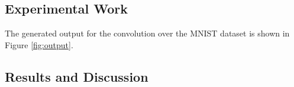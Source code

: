 \documentclass[3p,times,procedia]{elsarticle}
\begin{document}
\subsection{\textbf{Experimental Work}}
The generated output for the convolution over the MNIST dataset is shown in Figure \ref{fig:output}.




\vspace{-0.5cm}
\subsection{\textbf{Results and Discussion}}
\end{document}
